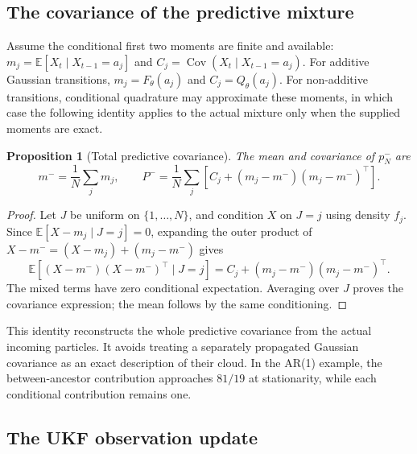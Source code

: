 \documentclass[11pt,a4paper]{article}
\newcommand{\E}{\mathbb E}
\newcommand{\Cov}{\operatorname{Cov}}
\newtheorem{proposition}{Proposition}[section]
\begin{document}
\subsection{The covariance of the predictive mixture}

Assume the conditional first two moments are finite and available:
\(m_j=\E[X_t\mid X_{t-1}=a_j]\) and
\(C_j=\Cov(X_t\mid X_{t-1}=a_j)\).
For additive Gaussian transitions, \(m_j=F_\theta(a_j)\) and
\(C_j=Q_\theta(a_j)\). For non-additive transitions, conditional quadrature
may approximate these moments, in which case the following identity applies
to the actual mixture only when the supplied moments are exact.

\begin{proposition}[Total predictive covariance]
The mean and covariance of \(p_N^-\) are
\begin{equation}
\label{eq:mixture-moments}
 m^-=\frac1N\sum_jm_j,\qquad
 P^-=\frac1N\sum_j\left[
 C_j+(m_j-m^-)(m_j-m^-)^\top\right].
\end{equation}
\end{proposition}
\begin{proof}
Let \(J\) be uniform on \(\{1,\ldots,N\}\), and condition \(X\) on
\(J=j\) using density \(f_j\). Since
\(\E[X-m_j\mid J=j]=0\), expanding the outer product of
\(X-m^-=(X-m_j)+(m_j-m^-)\) gives
\[
 \E[(X-m^-)(X-m^-)^\top\mid J=j]
 =C_j+(m_j-m^-)(m_j-m^-)^\top .
\]
The mixed terms have zero conditional expectation. Averaging over \(J\)
proves the covariance expression; the mean follows by the same conditioning.
\end{proof}

This identity reconstructs the whole predictive covariance from the actual
incoming particles. It avoids treating a separately propagated Gaussian
covariance as an exact description of their cloud. In the AR(1) example,
the between-ancestor contribution approaches \(81/19\) at stationarity,
while each conditional contribution remains one.

\subsection{The UKF observation update}
\end{document}

